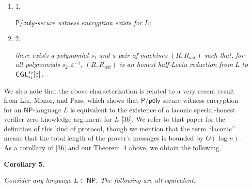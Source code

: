 \documentclass[10pt,a4paper]{article}
\begin{document}
\begin{enumerate}


\item[] 
1. 


${\mathsf{P}}/{\mathsf{poly}}$\emph{-secure witness encryption exists for }$L$\emph{;}\par





\item[] 
2. 


\emph{there exists a polynomial }$s_{1}$\emph{ and a pair of machines }$(R,R_{wit})$\emph{ such that, for all polynomials }$s_{2},\varepsilon^{-1}$\emph{, }$(R,R_{wit})$\emph{ is an honest half-Levin reduction from }$L$\emph{ to }${\sf CGL}^{s_{2}}_{s_{1}}[\varepsilon]$\emph{.}\par





\end{enumerate}







We also note that the above characterization is related to a very recent result from Liu, Mazor, and Pass, which shows that ${\mathsf{P}}/{\mathsf{poly}}$-secure witness encryption for an ${\mathsf{NP}}$-language $L$ is equivalent to the existence of a laconic special-honest verifier zero-knowledge argument for $L$ [36]. We refer to that paper for the definition of this kind of protocol, though we mention that the term “laconic” means that the total length of the prover’s messages is bounded by $O(\log n)$. As a corollary of [36] and our Theorem 4 above, we obtain the following.\par





\par\medskip\noindent\textbf{
\textbf{Corollary 5}\textbf{.}
}\par



\emph{Consider any language $L\in{\mathsf{NP}}$. The following are all equivalent.}\par
\end{document}
